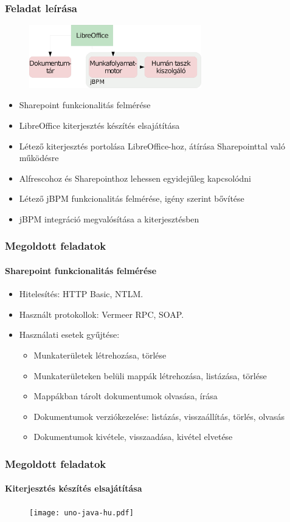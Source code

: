 \documentclass{beamer}
\begin{document}
\begin{frame}
\frametitle{Feladat leírása}
\begin{figure}[H]
\includegraphics[width=75mm,keepaspectratio]{test-arch-wf-hu.pdf}
\end{figure}
\begin{itemize}
\item Sharepoint funkcionalitás felmérése
\item LibreOffice kiterjesztés készítés elsajátítása
\item Létező kiterjesztés portolása LibreOffice-hoz, átírása Sharepointtal való működésre
\item Alfrescohoz és Sharepointhoz lehessen egyidejűleg kapcsolódni
\item Létező jBPM funkcionalitás felmérése, igény szerint bővítése
\item jBPM integráció megvalósítása a kiterjesztésben
\end{itemize}
\end{frame}

\begin{frame}
\frametitle{Megoldott feladatok}
\framesubtitle{Sharepoint funkcionalitás felmérése}
\begin{itemize}
\item Hitelesítés: HTTP Basic, NTLM.
\item Használt protokollok: Vermeer RPC, SOAP.
\item Használati esetek gyűjtése:
\begin{itemize}
\item Munkaterületek létrehozása, törlése
\item Munkaterületeken belüli mappák létrehozása, listázása, törlése
\item Mappákban tárolt dokumentumok olvasása, írása
\item Dokumentumok verziókezelése: listázás, visszaállítás, törlés, olvasás
\item Dokumentumok kivétele, visszaadása, kivétel elvetése
\end{itemize}
\end{itemize}
\end{frame}

\begin{frame}
\frametitle{Megoldott feladatok}
\framesubtitle{Kiterjesztés készítés elsajátítása}

\begin{figure}[H]
\texttt{[image: uno-java-hu.pdf]}
\end{figure}
\end{frame}
\end{document}
